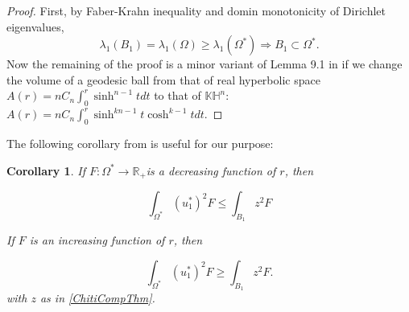 \documentclass{amsart}
\numberwithin{equation}{section}
\theoremstyle{plain}
\newtheorem{cor}[theorem]{Corollary}
\theoremstyle{definition}
\theoremstyle{remark}
\newtheorem{remark}{Remark}[section]
\def\KK {\mathbb{K}}
\def\HH {\mathbb{H}}
\begin{document}
\begin{proof}
    First, by Faber-Krahn inequality and domin monotonicity of Dirichlet eigenvalues, 
    \[\lambda_1(B_1)= \lambda_1(\Omega) \geq \lambda_1\left(\Omega^*\right) \Longrightarrow B_1 \subset\Omega^*.\]
Now the remaining of the proof is a minor variant of Lemma 9.1 in \cite{benguria2007second} if we change the volume of a geodesic ball from that of real hyperbolic space $A(r) = nC_n \int_0^r \sinh^{n-1}{t}dt$ to that of $\KK\HH^n$: $A(r) =nC_n \int_0^r \sinh^{kn-1}{t}\cosh^{k-1}{t}dt$. 


    
\end{proof}
The following corollary from \cite[Corollary~3.3]{edelen2017ppw} is useful for our purpose:
\begin{cor}\label{ChitiCoro}
     If $F: \Omega^* \rightarrow \mathbb{R}_{+}$is a decreasing function of $r$, then

$$
\int_{\Omega^*}\left( u^*_1\right)^2 F \leq \int_{B_1} z^2 F
$$

If $F$ is an increasing function of $r$, then

$$
\int_{\Omega^*}\left(u^*_1\right)^2 F \geq \int_{B_1} z^2 F .
$$
with $z$ as in \cref{ChitiCompThm}.
\end{cor}


\end{document}
